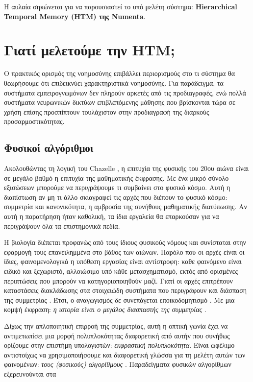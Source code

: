   Η αυλαία σηκώνεται για να παρουσιαστεί το υπό μελέτη σύστημα: \textbf{Hierarchical Temporal Memory (HTM) της Numenta}.

\section{Γιατί μελετούμε την HTM;}

  Ο πρακτικός ορισμός της νοημοσύνης επιβάλλει περιορισμούς στο τι σύστημα θα θεωρήσουμε ότι επιδεικνύει χαρακτηριστικά νοημοσύνης.
  Για παράδειγμα, τα συστήματα εμπειρογνωμόνων δεν πληρούν αρκετές από τις προδιαγραφές, ενώ πολλά συστήματα νευρωνικών
  δικτύων επιβλεπόμενης μάθησης που βρίσκονται τώρα σε χρήση επίσης προσπίπτουν τουλάχιστον στην προδιαγραφή της διαρκούς προσαρμοστικότητας.

\subsection{Φυσικοί αλγόριθμοι}

  Ακολουθώντας τη λογική του Chazelle \cite{chazelleNaturalAlgorithmsInfluence2012}, η επιτυχία της φυσικής του 20ου αιώνα είναι σε μεγάλο βαθμό η επιτυχία της μαθηματικής έκφρασης.
  Με ένα μικρό σύνολο εξισώσεων μπορούμε να περιγράψουμε τι συμβαίνει στο φυσικό κόσμο.
  Αυτή η διαπίστωση αν μη τι άλλο σκιαγραφεί τις αρχές που διέπουν το φυσικό κόσμο:
  συμμετρία και κανονικότητα, η αμβροσία της συνήθους μαθηματικής διατύπωσης.
  Αν αυτή η παρατήρηση ήταν καθολική, τα ίδια εργαλεία θα επαρκούσαν για να περιγράψουν όλα τα επιστημονικά πεδία.

  Η βιολογία διέπεται προφανώς από τους ίδιους φυσικούς νόμους και συνίσταται στην εφαρμογή τους επανειλημμένα στο βάθος των αιώνων.
  Παρόλο που οι αρχές είναι οι ίδιες, φαινομενολογικά η υπόθεση εργασίας είναι αντίστροφη:
  καθε φαινόμενο είναι ειδικό και ξεχωριστό, αλλοιώσιμο υπό κάθε μετασχηματισμό, εκτός από ορισμένες περιπτώσεις που μπορούν να κατηγοριοποιηθούν μαζί.
  Γιατί οι αρχές επιτρέπουν καταστάσεις διακλάδωσης στα στοιχειώδη συστήματα που περιγράφουν και διάσπαση της συμμετρίας \parencite{bradingSymmetrySymmetryBreaking2017}.
  Έτσι, ο αναγωγισμός δε συνεπάγεται εποικοδομητισμό \parencite{andersonMoreDifferent1972}.
  Με μια κομψή έκφραση: \textit{η ιστορία είναι ο μεγάλος διασπαστής της συμμετρίας} \parencite{chazelleNaturalAlgorithmsInfluence2012}.

  Δίχως την απλοποιητική επιρροή της συμμετρίας, αυτή η οπτική γωνία έχει να αντιμετωπίσει μια μορφή πολυπλοκότητας διαφορετική
  από αυτήν που συνήθως ορίζουμε στην επιστήμη υπολογιστών: \textit{εκφραστική πολυπλοκότητα}.
  Είναι ωφέλιμο αντιστοίχως να χρησιμοποιήσουμε και διαφορετική γλώσσα για τη μελέτη
  αυτών των φαινομένων: \textit{τους (φυσικούς) αλγορίθμους} \parencite{chazelleNaturalAlgorithmsInfluence2012}.
  Παραδείγματα φυσικών αλγορίθμων εξερευνούνται στα \cite{patonComputationCellsTissues2013,adamatzkyAdvancesPhysarumMachines2016}
  \medskip

